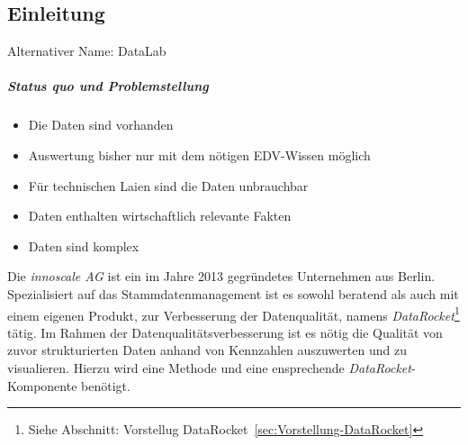 \documentclass[
  language=german, %
  type=bachelor%
]{isthesis}
\begin{document}
\begin{content}



  \chapter{Einleitung}

  Alternativer Name: DataLab


  \paragraph{Status quo und Problemstellung}
  \begin{itemize}
    \item Die Daten sind vorhanden
    \item Auswertung bisher nur mit dem nötigen EDV-Wissen möglich
    \item Für technischen Laien sind die Daten unbrauchbar
    \item Daten enthalten wirtschaftlich relevante Fakten
    \item Daten sind komplex
  \end{itemize}

  Die \textit{innoscale AG} ist ein im Jahre 2013 gegründetes Unternehmen aus
  Berlin.  Spezialisiert auf das Stammdatenmanagement ist es sowohl beratend
  als auch mit einem eigenen Produkt, zur Verbesserung der Datenqualität, namens
  \textit{DataRocket}\footnote{Siehe Abschnitt: Vorstellug
  DataRocket~\ref{sec:Vorstellung-DataRocket}} tätig. Im Rahmen der
  Datenqualitätsverbesserung ist es nötig die Qualität von zuvor strukturierten
  Daten anhand von Kennzahlen auszuwerten und zu visualieren. Hierzu wird eine
  Methode und eine ensprechende \textit{DataRocket}-Komponente benötigt.


\end{content}
\end{document}
